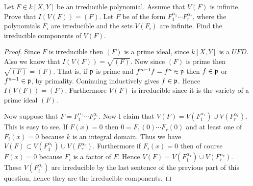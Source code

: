\documentclass{article}
\begin{document}
\begin{problem}
  Let $F\in k[X,Y]$ be an irreducible polynomial. Assume that $V(F)$ is
  infinite. Prove that $I(V(F))=(F)$. Let $F$ be of the form
  $F_1^{\alpha_1}\cdots F_r^{\alpha_r}$, where the polynomials $F_i$ are
  irreducible and the sets $V(F_i)$ are infinite. Find the irreducible
  components of $V(F)$.
  \begin{proof}
    Since $F$ is irreducible then $(F)$ is a prime ideal, since $k[X,Y]$ is
    a $UFD$. 
    Also we know that $I(V(F))=\sqrt{(F)}$. Now since
    $(F)$ is prime then $\sqrt{(F)}=(F)$. That is, if $\mathfrak{p}$ is prime and
    $f^{n-1}f=f^n\in\mathfrak{p}$ then
    $f\in\mathfrak{p}$ or $f^{n-1}\in\mathfrak{p}$, by primality. Coninuing inductively
    gives $f\in\mathfrak{p}$. Hence $I(V(F))=(F)$. Furthermore
    $V(F)$ is irreducible since it is the variety of a prime ideal $(F)$.

    Now suppose that $F=F_1^{\alpha_1}\cdots F_r^{\alpha_r}$. Now
    I claim that $V(F)=V(F_1^{\alpha_1})\cup V(F_r^{\alpha_r})$. 
    This is easy to see. If $F(x)=0$ then $0=F_1(0)\cdots F_r(0)$ and at
    least one of $F_i(x)=0$ because $k$ is an integral domain. Thus we have
    $V(F)\subset V(F_1^{\alpha_1})\cup V(F_r^{\alpha_r})$. Furthermore if
    $F_i(x)=0$ then of course $F(x)=0$ because $F_i$ is a factor of $F$.
    Hence $V(F)=V(F_1^{\alpha_1})\cup V(F_r^{\alpha_r})$.
    These
    $V(F_i^{\alpha_i})$ are irreducible by the last sentence of the
    previous part of this question, hence they are the irreducible
    components.
  \end{proof}
\end{problem}
\end{document}

